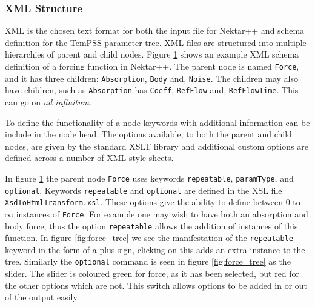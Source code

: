 \documentclass[11pt, a4paper]{report}
\begin{document}
\subsubsection{XML Structure}
XML is the chosen text format for both the input file for Nektar++ and schema definition for the TemPSS parameter tree. XML files are structured into multiple hierarchies of parent and child nodes. Figure \ref{fig:XML} shows an example XML schema definition of a forcing function in Nektar++. The parent node is named \texttt{Force}, and it has three children: \texttt{Absorption}, \texttt{Body} and, \texttt{Noise}. The children may also have children, such as \texttt{Absorption} has \texttt{Coeff}, \texttt{RefFlow} and, \texttt{RefFlowTime}. This can go on \textit{ad infinitum}.

\begin{figure}[htb!]
 \centering
 
 \label{fig:XML}
\end{figure}

To define the functionality of a node keywords with additional information can be include in the node head. The options available, to both the parent and child nodes, are given by the standard XSLT library and additional custom options are defined across a number of XML style sheets. 

In figure \ref{fig:XML} the parent node \texttt{Force} uses keywords \texttt{repeatable}, \texttt{paramType}, and \texttt{optional}. Keywords \texttt{repeatable} and \texttt{optional} are defined in the XSL file \texttt{XsdToHtmlTransform.xsl}. These options give the ability to define between $0$ to $\infty$ instances of \texttt{Force}. For example one may wish to have both an absorption and body force, thus the option \texttt{repeatable} allows the addition of instances of this function. In figure \ref{fig:force_tree} we see the manifestation of the \texttt{repeatable} keyword in the form of a plus sign, clicking on this adds an extra instance to the tree. Similarly the \texttt{optional} command is seen in figure \ref{fig:force_tree} as the slider. The slider is coloured green for force, as it has been selected, but red for the other options which are not. This switch allows options to be added in or out of the output easily.
\end{document}
